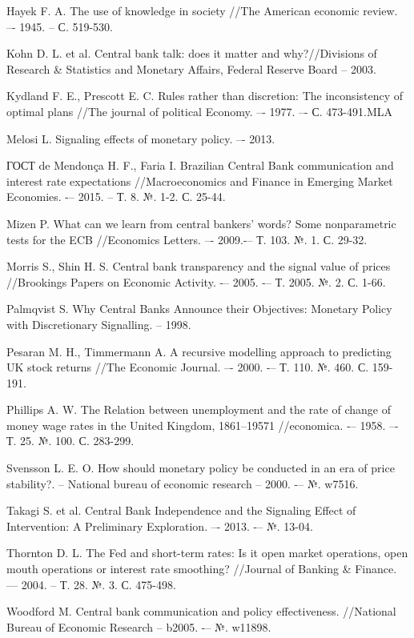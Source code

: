 \documentclass[14pt,a4paper, oneside]{extreport}
\theoremstyle{plain}              %
\theoremstyle{definition}         %
\begin{document}
\begin{thebibliography}{99}
 Hayek F. A. The use of knowledge in society //The American economic review. –- 1945. -- С. 519-530.

 Kohn D. L. et al. Central bank talk: does it matter and why?//Divisions of Research \& Statistics and Monetary Affairs, Federal Reserve Board -- 2003.

 Kydland F. E., Prescott E. C. Rules rather than discretion: The inconsistency of optimal plans //The journal of political Economy. –- 1977. –- С. 473-491.MLA	


 Melosi L. Signaling effects of monetary policy. –- 2013.

 ГОСТ	
de Mendonça H. F., Faria I. Brazilian Central Bank communication and interest rate expectations //Macroeconomics and Finance in Emerging Market Economies. -– 2015. -- Т. 8. №. 1-2. С. 25-44.

 Mizen P. What can we learn from central bankers' words? Some nonparametric tests for the ECB //Economics Letters. –- 2009.-– Т. 103. №. 1. С. 29-32.

 Morris S., Shin H. S. Central bank transparency and the signal value of prices //Brookings Papers on Economic Activity. -– 2005. -– Т. 2005. №. 2. С. 1-66.

 Palmqvist S. Why Central Banks Announce their Objectives: Monetary Policy with Discretionary Signalling. -- 1998.

 Pesaran M. H., Timmermann A. A recursive modelling approach to predicting UK stock returns //The Economic Journal. –- 2000. -– Т. 110. №. 460. С. 159-191.

 Phillips A. W. The Relation between unemployment and the rate of change of money wage rates in the United Kingdom, 1861–19571 //economica. -– 1958. –- Т. 25. №. 100. С. 283-299.

 Svensson L. E. O. How should monetary policy be conducted in an era of price stability?. – National bureau of economic research -- 2000. -– №. w7516.

 Takagi S. et al. Central Bank Independence and the Signaling Effect of Intervention: A Preliminary Exploration. –- 2013. -– №. 13-04.

 Thornton D. L. The Fed and short-term rates: Is it open market operations, open mouth operations or interest rate smoothing? //Journal of Banking \& Finance. –-- 2004. -- Т. 28. №. 3. С. 475-498.

 Woodford M. Central bank communication and policy effectiveness. //National Bureau of Economic Research -- b2005. -– №. w11898.

\end{thebibliography}
\end{document}
